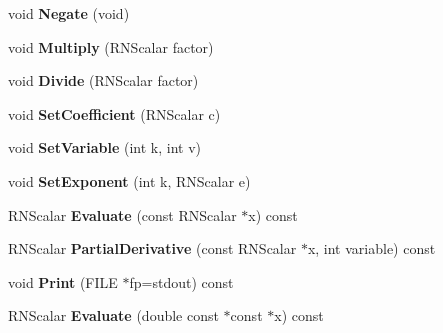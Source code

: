 \begin{DoxyCompactItemize}
\item 
void {\bfseries Negate} (void)\hypertarget{class_r_n_polynomial_term_a7125cd6e16985d274e2403e004b81973}{}\label{class_r_n_polynomial_term_a7125cd6e16985d274e2403e004b81973}

\item 
void {\bfseries Multiply} (R\+N\+Scalar factor)\hypertarget{class_r_n_polynomial_term_a9b61b8b107d41ac8bfa70848bb7d32a5}{}\label{class_r_n_polynomial_term_a9b61b8b107d41ac8bfa70848bb7d32a5}

\item 
void {\bfseries Divide} (R\+N\+Scalar factor)\hypertarget{class_r_n_polynomial_term_a717f4c6810c6ce64e8bc8c7136eb1c74}{}\label{class_r_n_polynomial_term_a717f4c6810c6ce64e8bc8c7136eb1c74}

\item 
void {\bfseries Set\+Coefficient} (R\+N\+Scalar c)\hypertarget{class_r_n_polynomial_term_aed4df9ddf8538246d2bc61f5ddfb36c4}{}\label{class_r_n_polynomial_term_aed4df9ddf8538246d2bc61f5ddfb36c4}

\item 
void {\bfseries Set\+Variable} (int k, int v)\hypertarget{class_r_n_polynomial_term_a2eaa98fb0fdbdcbd3b4b96a477f54f01}{}\label{class_r_n_polynomial_term_a2eaa98fb0fdbdcbd3b4b96a477f54f01}

\item 
void {\bfseries Set\+Exponent} (int k, R\+N\+Scalar e)\hypertarget{class_r_n_polynomial_term_a4a7c649ffd37f8c4d6b078d846af2a87}{}\label{class_r_n_polynomial_term_a4a7c649ffd37f8c4d6b078d846af2a87}

\item 
R\+N\+Scalar {\bfseries Evaluate} (const R\+N\+Scalar $\ast$x) const \hypertarget{class_r_n_polynomial_term_a4c9a1869e4e45c56dc9f47586abc6ef4}{}\label{class_r_n_polynomial_term_a4c9a1869e4e45c56dc9f47586abc6ef4}

\item 
R\+N\+Scalar {\bfseries Partial\+Derivative} (const R\+N\+Scalar $\ast$x, int variable) const \hypertarget{class_r_n_polynomial_term_aec4e21ce64ce0b6e5b49682957f5bfa9}{}\label{class_r_n_polynomial_term_aec4e21ce64ce0b6e5b49682957f5bfa9}

\item 
void {\bfseries Print} (F\+I\+LE $\ast$fp=stdout) const \hypertarget{class_r_n_polynomial_term_a8037d8ddb0a3788455c9c618c605fffa}{}\label{class_r_n_polynomial_term_a8037d8ddb0a3788455c9c618c605fffa}

\item 
R\+N\+Scalar {\bfseries Evaluate} (double const $\ast$const $\ast$x) const \hypertarget{class_r_n_polynomial_term_a89eecc15f042524ee5461f14af89c31c}{}\label{class_r_n_polynomial_term_a89eecc15f042524ee5461f14af89c31c}


\end{DoxyCompactItemize}
